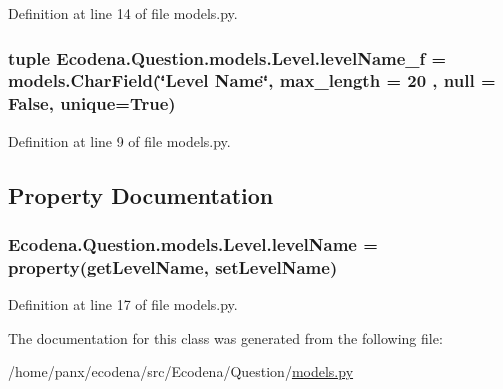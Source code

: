 Definition at line 14 of file models.py.

\hypertarget{class_ecodena_1_1_question_1_1models_1_1_level_a382048e5ad81690f65ed99a76d75d456}{
\subsubsection[{levelName\_\-f}]{\setlength{\rightskip}{0pt plus 5cm}tuple {\bf Ecodena.Question.models.Level.levelName\_\-f} = models.CharField(\char`\"{}Level Name\char`\"{}, max\_\-length = 20 , null = False, unique=True)}}
\label{da/d99/class_ecodena_1_1_question_1_1models_1_1_level_a382048e5ad81690f65ed99a76d75d456}


Definition at line 9 of file models.py.



\subsection{Property Documentation}
\hypertarget{class_ecodena_1_1_question_1_1models_1_1_level_a3a8da4d8c87344f8e1c6f7543253ebc2}{
\subsubsection[{levelName}]{\setlength{\rightskip}{0pt plus 5cm}Ecodena.Question.models.Level.levelName = property(getLevelName, setLevelName)}}
\label{da/d99/class_ecodena_1_1_question_1_1models_1_1_level_a3a8da4d8c87344f8e1c6f7543253ebc2}


Definition at line 17 of file models.py.



The documentation for this class was generated from the following file:\begin{DoxyCompactItemize}
\item 
/home/panx/ecodena/src/Ecodena/Question/\hyperlink{_question_2models_8py}{models.py}\end{DoxyCompactItemize}
